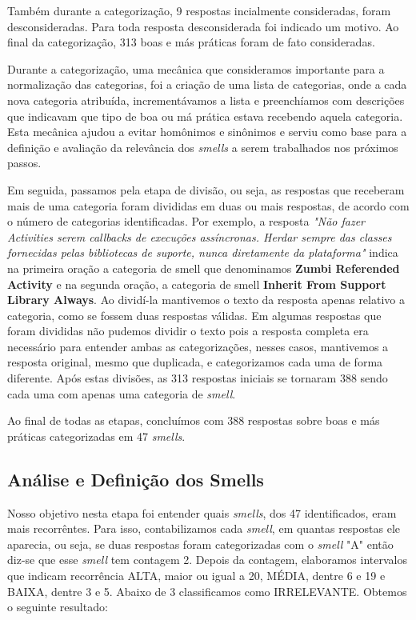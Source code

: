 Tamb\'em durante a categoriza\c{c}\~ao, 9 respostas incialmente consideradas, foram desconsideradas. Para toda resposta desconsiderada foi indicado um motivo. Ao final da categoriza\c{c}\~ao, 313 boas e m\'as pr\'aticas foram de fato consideradas.

Durante a categoriza\c{c}\~ao, uma mec\^anica que consideramos importante para a normaliza\c{c}\~ao das categorias, foi a cria\c{c}\~ao de uma lista de categorias, onde a cada nova categoria atribu\'ida, increment\'avamos a lista e preench\'iamos com descri\c{c}\~oes que indicavam que tipo de boa ou m\'a pr\'atica estava recebendo aquela categoria. Esta mec\^anica ajudou a evitar hom\^onimos e sin\^onimos e serviu como base para a defini\c{c}\~ao e avalia\c{c}\~ao da relev\^ancia dos \textit{smells} a serem trabalhados nos pr\'oximos passos.

Em seguida, passamos pela etapa de divis\~ao, ou seja, as respostas que receberam mais de uma categoria foram divididas em duas ou mais respostas, de acordo com o n\'umero de categorias identificadas. Por exemplo, a resposta \textit{"N\~ao fazer Activities serem callbacks de execu\c{c}\~oes ass\'incronas. Herdar sempre das classes fornecidas pelas bibliotecas de suporte, nunca diretamente da plataforma"} indica na primeira ora\c{c}\~ao a categoria de smell que denominamos \textbf{Zumbi Referended Activity} e na segunda ora\c{c}\~ao, a categoria de smell \textbf{Inherit From Support Library Always}. Ao divid\'i-la mantivemos o texto da resposta apenas relativo a categoria, como se fossem duas respostas v\'alidas. Em algumas respostas que foram divididas n\~ao pudemos dividir o texto pois a resposta completa era necess\'ario para entender ambas as categoriza\c{c}\~oes, nesses casos, mantivemos a resposta original, mesmo que duplicada, e categorizamos cada uma de forma diferente. Ap\'os estas divis\~oes, as 313 respostas iniciais se tornaram 388 sendo cada uma com apenas uma categoria de \textit{smell}. 

Ao final de todas as etapas, conclu\'imos com 388 respostas sobre boas e m\'as pr\'aticas categorizadas em 47 \textit{smells}. 

\subsection{An\'alise e Defini\c{c}\~ao dos Smells}
\label{sub:analisys-definition}

Nosso objetivo nesta etapa foi entender quais \textit{smells}, dos 47 identificados, eram mais recorr\^entes. Para isso, contabilizamos cada \textit{smell}, em quantas respostas ele aparecia, ou seja, se duas respostas foram categorizadas com o \textit{smell} "A" ent\~ao diz-se que esse \textit{smell} tem contagem 2. Depois da contagem, elaboramos intervalos que indicam recorr\^encia ALTA, maior ou igual a 20, M\'EDIA, dentre 6 e 19 e BAIXA, dentre 3 e 5. Abaixo de 3 classificamos como IRRELEVANTE. Obtemos o seguinte resultado:

